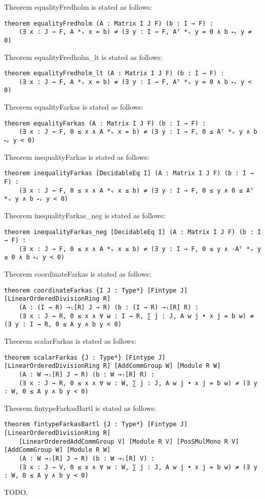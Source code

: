 \documentclass[]{article}
\renewcommand{\.}{\hskip .75pt}
\begin{document}
\noindent
Theorem equalityFredholm is stated as follows:
\begin{lstlisting}
theorem equalityFredholm (A : Matrix I J F) (b : I → F) :
    (∃ x : J → F, A *ᵥ x = b) ≠ (∃ y : I → F, Aᵀ *ᵥ y = 0 ∧ b ⬝ᵥ y ≠ 0)
\end{lstlisting}
Theorem equalityFredholm\_lt is stated as follows:
\begin{lstlisting}
theorem equalityFredholm_lt (A : Matrix I J F) (b : I → F) :
    (∃ x : J → F, A *ᵥ x = b) ≠ (∃ y : I → F, Aᵀ *ᵥ y = 0 ∧ b ⬝ᵥ y < 0)
\end{lstlisting}
Theorem equalityFarkas is stated as follows:
\begin{lstlisting}
theorem equalityFarkas (A : Matrix I J F) (b : I → F) :
    (∃ x : J → F, 0 ≤ x ∧ A *ᵥ x = b) ≠ (∃ y : I → F, 0 ≤ Aᵀ *ᵥ y ∧ b ⬝ᵥ y < 0)
\end{lstlisting}
Theorem inequalityFarkas is stated as follows:
\begin{lstlisting}
theorem inequalityFarkas [DecidableEq I] (A : Matrix I J F) (b : I → F) :
    (∃ x : J → F, 0 ≤ x ∧ A *ᵥ x ≤ b) ≠ (∃ y : I → F, 0 ≤ y ∧ 0 ≤ Aᵀ *ᵥ y ∧ b ⬝ᵥ y < 0)
\end{lstlisting}
Theorem inequalityFarkas\_neg is stated as follows:
\begin{lstlisting}
theorem inequalityFarkas_neg [DecidableEq I] (A : Matrix I J F) (b : I → F) :
    (∃ x : J → F, 0 ≤ x ∧ A *ᵥ x ≤ b) ≠ (∃ y : I → F, 0 ≤ y ∧ -Aᵀ *ᵥ y ≤ 0 ∧ b ⬝ᵥ y < 0)
\end{lstlisting}
Theorem coordinateFarkas is stated as follows:
\begin{lstlisting}
theorem coordinateFarkas {I J : Type*} [Fintype J] [LinearOrderedDivisionRing R]
    (A : (I → R) →ₗ[R] J → R) (b : (I → R) →ₗ[R] R) :
    (∃ x : J → R, 0 ≤ x ∧ ∀ w : I → R, ∑ j : J, A w j • x j = b w) ≠ (∃ y : I → R, 0 ≤ A y ∧ b y < 0)
\end{lstlisting}
Theorem scalarFarkas is stated as follows:
\begin{lstlisting}
theorem scalarFarkas {J : Type*} [Fintype J] [LinearOrderedDivisionRing R] [AddCommGroup W] [Module R W]
    (A : W →ₗ[R] J → R) (b : W →ₗ[R] R) :
    (∃ x : J → R, 0 ≤ x ∧ ∀ w : W, ∑ j : J, A w j • x j = b w) ≠ (∃ y : W, 0 ≤ A y ∧ b y < 0)
\end{lstlisting}
Theorem fintypeFarkasBartl is stated as follows:
\begin{lstlisting}
theorem fintypeFarkasBartl {J : Type*} [Fintype J] [LinearOrderedDivisionRing R]
    [LinearOrderedAddCommGroup V] [Module R V] [PosSMulMono R V] [AddCommGroup W] [Module R W]
    (A : W →ₗ[R] J → R) (b : W →ₗ[R] V) :
    (∃ x : J → V, 0 ≤ x ∧ ∀ w : W, ∑ j : J, A w j • x j = b w) ≠ (∃ y : W, 0 ≤ A y ∧ b y < 0)
\end{lstlisting}
TODO.
\end{document}
